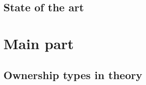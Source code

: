 \documentclass[sigplan,11pt,nonacm]{acmart}
\begin{document}


\subsection{State of the art}




\section{Main part}
\label{sec:mainpart}


\subsection{Ownership types in theory}




\end{document}
